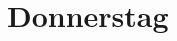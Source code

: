 \documentclass{uebung_cs}
\begin{document}
\section*{Donnerstag}
\begin{aufgabe}

\end{aufgabe}

\begin{aufgabe}[Balance]
    
\end{aufgabe}
    
\begin{aufgabe}
\end{aufgabe}
\end{document}
